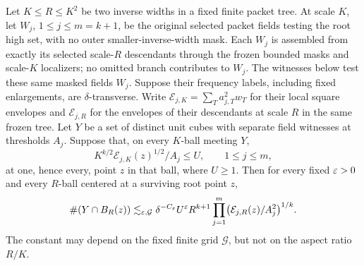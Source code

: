 \begin{lemma}
\label{f:cross-field-inflation}
Let $K\le R\le K^2$ be two inverse widths in a fixed finite packet
tree. At scale $K$, let $W_j$, $1\le j\le m=k+1$, be the original
selected packet fields testing the root high set, with no outer
smaller-inverse-width mask. Each $W_j$ is assembled from exactly its
selected scale-$R$ descendants through the frozen bounded masks and
scale-$K$ localizers; no omitted branch contributes to $W_j$.
The witnesses below test these same masked fields $W_j$.
Suppose their frequency labels,
including fixed enlargements, are $\delta$-transverse. Write
$\mathcal E_{j,K}=\sum_Ta_{j,T}^2w_T$ for their local square
envelopes and $\mathcal E_{j,R}$ for the envelopes of their
descendants at scale $R$ in the same frozen tree. Let $Y$ be a set
of distinct unit cubes with separate field witnesses at thresholds
$A_j$. Suppose that, on every $K$-ball meeting $Y$,
\[
 K^{k/2}\mathcal E_{j,K}(z)^{1/2}/A_j\le U,
 \qquad 1\le j\le m,
\]
at one, hence every, point $z$ in that ball, where $U\ge1$.
Then for every fixed $\varepsilon>0$ and every $R$-ball centered at a
surviving root point $z$,
\begin{equation}\label{f:cross-field-inflation-bound}
 \#(Y\cap B_R(z))
 \lesssim_{\varepsilon,\mathcal G}\delta^{-C_\varepsilon}U^\varepsilon R^{k+1}
 \prod_{j=1}^m\bigl(\mathcal E_{j,R}(z)/A_j^2\bigr)^{1/k}.
\end{equation}
The constant may depend on the fixed finite grid $\mathcal G$, but
not on the aspect ratio $R/K$.
\end{lemma}

